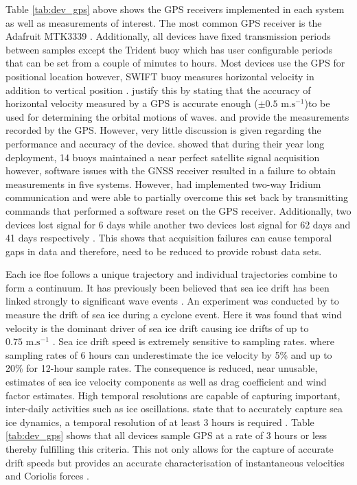 Table \ref{tab:dev_gps} above shows the GPS receivers implemented in each system as well as measurements of interest. The most common GPS receiver is the Adafruit MTK3339 \cite{mtk3339}. Additionally, all devices have fixed transmission periods between samples except the Trident buoy which has user configurable periods that can be set from a couple of minutes to hours. Most devices use the GPS for positional location however, SWIFT buoy measures horizontal velocity in addition to vertical position \cite{thomson2012wave}.  \textcite{thomson2012wave} justify this by stating that the accuracy of horizontal velocity measured by a GPS is accurate enough ($\pm 0.5 \text{ m.s}^{-1}$)to be used for determining the orbital motions of waves. \textcite{kohout2015device} and \textcite{rabault2019open} provide the measurements recorded by the GPS. However, very little discussion is given regarding the performance and accuracy of the device. \textcite{doble2017robust} showed that during their year long deployment, 14 buoys maintained a near perfect satellite signal acquisition however, software issues with the GNSS receiver resulted in a failure to obtain measurements in five systems. However, \textcite{doble2017robust} had implemented two-way Iridium communication and were able to partially overcome this set back by transmitting commands that performed a software reset on the GPS receiver. Additionally, two devices lost signal for 6 days while another two devices lost signal for 62 days and 41 days respectively \cite{doble2013wave}. This shows that acquisition failures can cause temporal gaps in data and therefore, need to be reduced to provide robust data sets.

Each ice floe follows a unique trajectory \cite{lepparanta2001sea}  and individual trajectories combine to form a continuum. It has previously been believed that sea ice drift has been linked strongly to significant wave events \cite{alberello2019drift}. An experiment was conducted by \textcite{alberello2019drift} to measure the drift of sea ice during a cyclone event. Here it was found that wind velocity is the dominant driver of sea ice drift \cite{alberello2019drift} causing ice drifts of up to $0.75\text{  m.s}^{-1}$ \cite{alberello2019drift}. Sea ice drift speed is extremely sensitive to sampling rates. \cite{alberello2019drift} where sampling rates of 6 hours can underestimate the ice velocity by 5\% \cite{alberello2019drift} and up to 20\% for 12-hour sample rates. The consequence is reduced, near unusable, estimates of sea ice velocity components as well as drag coefficient and wind factor estimates. High temporal resolutions are capable of capturing important, inter-daily activities such as ice oscillations. \textcite{alberello2019drift} state that to accurately capture sea ice dynamics, a temporal resolution of at least 3 hours is required \cite{alberello2019drift}. Table \ref{tab:dev_gps} shows that all devices sample GPS at a rate of 3 hours or less thereby fulfilling this criteria. This not only allows for the capture of accurate drift speeds but provides an accurate characterisation of instantaneous velocities and Coriolis forces \cite{alberello2019drift}.
 
